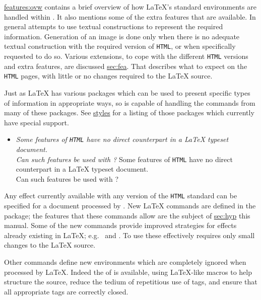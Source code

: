 \hyperref{The next page}{Section~}{}{features:ovw} contains a brief overview
of how \LaTeX's standard environments are handled within \latextohtml.
It also mentions some of the extra features that are available. \html{\\}%
In general \latextohtml{} attempts to use textual constructions to represent
the required information. Generation of an image is done only when there is
no adequate textual construction with the required version of \texttt{HTML},
or when specifically requested to do so.
Various extensions, to cope with the different \texttt{HTML} versions and
extra features, are discussed \hyperref{elsewhere}{in Section~}{}{sec:fea}.
That describes what to expect on the \texttt{HTML} pages, with little
or no changes required to the \LaTeX{} source.

Just as \LaTeX{} has various packages which can be used to present specific
types of information in appropriate ways, 
so is \latextohtml{} capable of handling the commands from many of these packages. 
See \hyperref{this table}{Table~}{}{styles} for a listing of those 
packages which currently have special support.

\label{quest2}%
\begin{itemize}
\item \latexhtml
{\emph{Some features of \texttt{HTML} have no direct counterpart in
a \LaTeX{} typeset document.\\Can such features be used with \latextohtml? }}
{{\large Some features of \texttt{HTML} have no direct counterpart in
a \LaTeX{} typeset document.\\Can such features be used with \latextohtml? }}
\end{itemize}
\noindent
Any effect currently available with any version of the \texttt{HTML} 
standard can be specified for a document processed by \latextohtml.
New \LaTeX{} commands are defined in the  package;
the features that these commands allow are the subject of
\hyperref{a whole section of}{Section~}{ in}{sec:hyp} this manual.
Some of the new commands provide improved strategies for effects 
already existing in \LaTeX; e.g.\ 
 and .
To use these effectively requires only small changes to the \LaTeX{} source.

Other commands define new environments which are completely
ignored when processed by \LaTeX. 
Indeed the  of \HTMLiii{} is available, 
using \LaTeX-like macros to help structure the source, 
reduce the tedium of repetitious use of tags, and ensure that
all appropriate tags are correctly closed.


